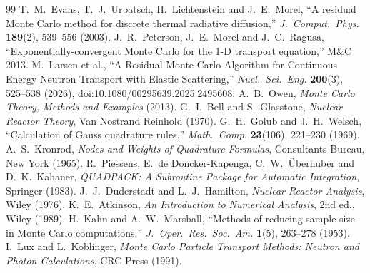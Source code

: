 \documentclass[11pt]{article}
\begin{document}
\begin{thebibliography}{99}
 T.~M.~Evans, T.~J.~Urbatsch, H.~Lichtenstein and J.~E.~Morel,
  ``A residual Monte Carlo method for discrete thermal radiative diffusion,''
  \emph{J.\ Comput.\ Phys.} \textbf{189}(2), 539--556 (2003).
 J.~R.~Peterson, J.~E.~Morel and J.~C.~Ragusa,
  ``Exponentially-convergent Monte Carlo for the 1-D transport equation,'' M\&C 2013.
 M.~Larsen et al., ``A Residual Monte Carlo Algorithm for Continuous
  Energy Neutron Transport with Elastic Scattering,'' \emph{Nucl.\ Sci.\ Eng.}
  \textbf{200}(3), 525--538 (2026), doi:10.1080/00295639.2025.2495608.
 A.~B.~Owen, \emph{Monte Carlo Theory, Methods and Examples} (2013).
 G.~I.~Bell and S.~Glasstone, \emph{Nuclear Reactor Theory}, Van
  Nostrand Reinhold (1970).
 G.~H.~Golub and J.~H.~Welsch, ``Calculation of Gauss quadrature
  rules,'' \emph{Math.\ Comp.} \textbf{23}(106), 221--230 (1969).
 A.~S.~Kronrod, \emph{Nodes and Weights of Quadrature Formulas},
  Consultants Bureau, New York (1965).
 R.~Piessens, E.~de Doncker-Kapenga, C.~W.~\"Uberhuber and
  D.~K.~Kahaner, \emph{QUADPACK: A Subroutine Package for Automatic Integration},
  Springer (1983).
 J.~J.~Duderstadt and L.~J.~Hamilton, \emph{Nuclear Reactor
  Analysis}, Wiley (1976).
 K.~E.~Atkinson, \emph{An Introduction to Numerical Analysis}, 2nd
  ed., Wiley (1989).
 H.~Kahn and A.~W.~Marshall, ``Methods of reducing sample size in Monte
  Carlo computations,'' \emph{J.\ Oper.\ Res.\ Soc.\ Am.} \textbf{1}(5), 263--278
  (1953).
 I.~Lux and L.~Koblinger, \emph{Monte Carlo Particle Transport Methods:
  Neutron and Photon Calculations}, CRC Press (1991).
\end{thebibliography}
\end{document}
